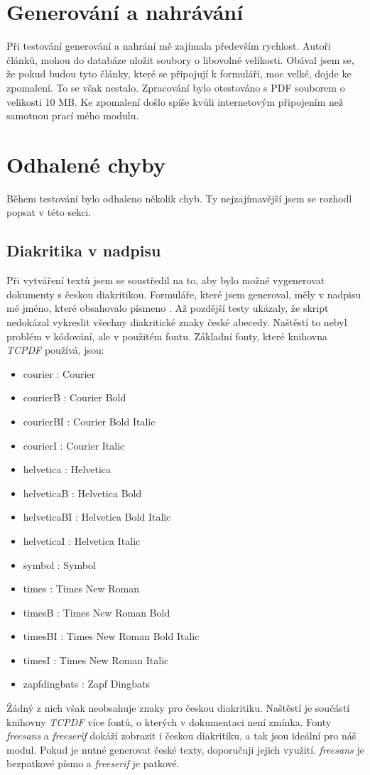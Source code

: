 \documentclass[czech,BP]{thesiskiv}
\begin{document}
\section{Generování a nahrávání}
Při testování generování a nahrání mě zajímala především rychlost. Autoři článků, mohou do databáze uložit soubory o libovolné velikosti. Obával jsem se, že pokud budou tyto články, které se připojují k formuláři, moc velké, dojde ke zpomalení. To se však nestalo. Zpracování bylo otestováno s PDF souborem o velikosti 10 MB. Ke zpomalení došlo spíše kvůli internetovým připojením než samotnou prací mého modulu. 
\section{Odhalené chyby}
Během testování bylo odhaleno několik chyb. Ty nejzajímavější jsem se rozhodl popsat v této sekci.
\subsection{Diakritika v nadpisu}
Při vytváření textů jsem se soustředil na to, aby bylo možné vygenerovat dokumenty s českou diakritikou. Formuláře, které jsem generoval, měly v nadpisu mé jméno, které obsahovalo písmeno . Až pozdější testy ukázaly, že skript nedokázal vykreslit všechny diakritické znaky české abecedy. Naštěstí to nebyl problém v kódování, ale v použitém fontu. Základní fonty, které knihovna \emph{TCPDF} používá, jsou:
\begin{itemize}
\item courier : Courier
\item courierB : Courier Bold
\item courierBI : Courier Bold Italic
\item courierI : Courier Italic
\item helvetica : Helvetica
\item helveticaB : Helvetica Bold
\item helveticaBI : Helvetica Bold Italic
\item helveticaI : Helvetica Italic
\item symbol : Symbol
\item times : Times New Roman
\item timesB : Times New Roman Bold
\item timesBI : Times New Roman Bold Italic
\item timesI : Times New Roman Italic
\item zapfdingbats : Zapf Dingbats
\end{itemize}
Žádný z nich však neobsahuje znaky pro českou diakritiku. Naštěstí je součástí knihovny \emph{TCPDF} více fontů, o kterých v dokumentaci není zmínka. Fonty \emph{freesans} a \emph{freeserif} dokáží zobrazit i českou diakritiku, a tak jsou ideální pro náš modul. Pokud je nutné generovat české texty, doporučuji jejich využití. \emph{freesans} je bezpatkové písmo a \emph{freeserif} je patkové.
\end{document}
